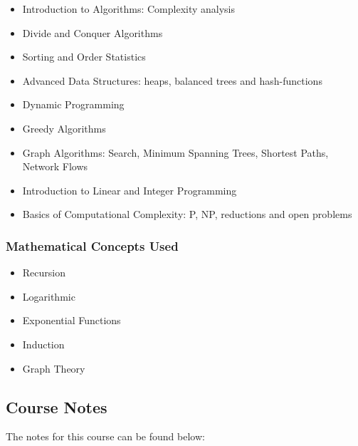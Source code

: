 {\begin{highlight}[\CSPBAlgo]
        \begin{itemize}
            \item Introduction to Algorithms: Complexity analysis
            \item Divide and Conquer Algorithms
            \item Sorting and Order Statistics
            \item Advanced Data Structures: heaps, balanced trees and hash-functions
            \item Dynamic Programming
            \item Greedy Algorithms
            \item Graph Algorithms: Search, Minimum Spanning Trees, Shortest Paths, Network Flows
            \item Introduction to Linear and Integer Programming
            \item Basics of Computational Complexity: P, NP, reductions and open problems
        \end{itemize}
    
        \subsubsection*{Mathematical Concepts Used}
        
        \begin{itemize}
            \item Recursion
            \item Logarithmic
            \item Exponential Functions
            \item Induction
            \item Graph Theory
        \end{itemize}
    \end{highlight}
}

\subsection{Course Notes}

The notes for this course can be found below: \coursedoc{\CSPBAlgoCourseNotes}




